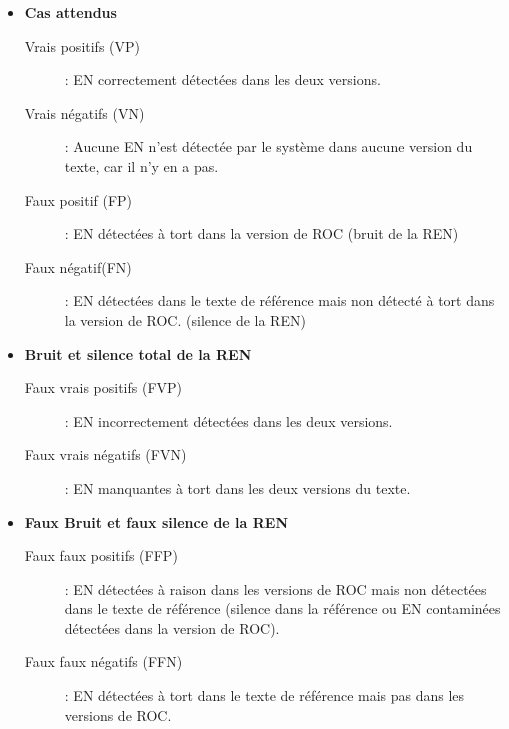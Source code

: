 \begin{itemize}


	\item \textbf{Cas attendus}
	
	
	\begin{description}

		\item[Vrais positifs (VP)]: EN correctement détectées dans les deux versions.
		\item[Vrais négatifs (VN)]: Aucune EN n'est détectée par le système dans aucune version du texte, car il n'y en a pas.
		\item[Faux positif (FP)]: EN détectées  à tort dans la version de ROC (bruit de la REN)
		\item[Faux négatif(FN)]: EN détectées dans le texte de référence mais non détecté à tort dans la version de ROC. (silence de la REN)
	\end{description}
	
		
	\item \textbf{Bruit et silence total de la REN}
	
	
	\begin{description}
	
		\item[Faux vrais positifs (FVP)]: EN incorrectement détectées dans les deux versions.
	
	 	\item[Faux vrais négatifs (FVN)] : EN manquantes à tort dans les deux versions du texte.
	 \end{description}
	 
	 \item \textbf{Faux Bruit et faux silence de la REN}
	
	\begin{description}
	
		\item[Faux faux positifs (FFP)]: EN détectées à raison dans les versions de ROC mais non détectées dans le texte de référence (silence dans la référence ou EN contaminées détectées dans la version de ROC).
		
 		\item[Faux faux négatifs (FFN)]: EN  détectées à tort dans le texte de référence mais pas dans les versions de ROC.

	\end{description}

\end{itemize}

%
%  
%
%

